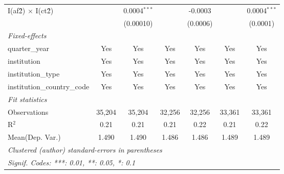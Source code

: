 \begin{tabular}{lcccccc}
   I(af\^2) $\times$ I(ct\^2)         &               & 0.0004$^{***}$ &               & -0.0003       &               & 0.0004$^{***}$\\   
                                      &               & (0.00010)      &               & (0.0006)      &               & (0.0001)\\   
   \midrule
   \emph{Fixed-effects}\\
   quarter\_year                      & Yes           & Yes            & Yes           & Yes           & Yes           & Yes\\  
   institution                        & Yes           & Yes            & Yes           & Yes           & Yes           & Yes\\  
   institution\_type                  & Yes           & Yes            & Yes           & Yes           & Yes           & Yes\\  
   institution\_country\_code         & Yes           & Yes            & Yes           & Yes           & Yes           & Yes\\  
   \midrule
   \emph{Fit statistics}\\
   Observations                       & 35,204        & 35,204         & 32,256        & 32,256        & 33,361        & 33,361\\  
   R$^2$                              & 0.21          & 0.21           & 0.21          & 0.22          & 0.21          & 0.22\\  
Mean(Dep. Var.) & 1.490 & 1.490 & 1.486 & 1.486 & 1.489 & 1.489 \\
   \midrule \midrule
   \multicolumn{7}{l}{\emph{Clustered (author) standard-errors in parentheses}}\\
   \multicolumn{7}{l}{\emph{Signif. Codes: ***: 0.01, **: 0.05, *: 0.1}}\\
\end{tabular}
\par\endgroup
